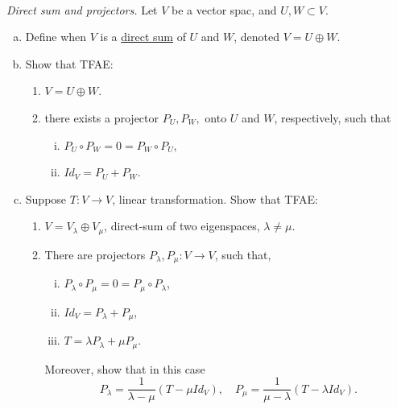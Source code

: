 \documentclass{article}
\begin{document}
\begin{problem} \\ 
\textit{Direct sum and projectors.} Let $V$ be a vector spac, and $U,W \subset V$.
\begin{enumerate}[(a)]
    \item Define when $V$ is a \underline{direct sum} of $U$ and $W$, denoted $V = U \oplus W$.
    \item Show that TFAE:
    \begin{enumerate}[1.]
        \item $V = U \oplus W$.
        \item there exists a projector $P_U, P_W,$ onto $U$ and $W$, respectively, such that
        \begin{enumerate}[i.)]
            \item $P_U \circ P_W = 0 = P_W \circ P_U$,
            \item $Id_V = P_U + P_W$.
        \end{enumerate}
    \end{enumerate}
    \item Suppose $T : V \to V$, linear transformation. Show that TFAE:
    \begin{enumerate}[1.]
        \item $V = V_\lambda \oplus V_\mu$, direct-sum of two eigenspaces, $\lambda \neq \mu$.
        \item There are projectors $P_\lambda, P_\mu: V \to V$, such that,
        \begin{enumerate}[i.)]
            \item $P_\lambda \circ P_\mu = 0 = P_\mu \circ P_\lambda$,
            \item $Id_V = P_\lambda + P_\mu$,
            \item $T = \lambda P_\lambda + \mu P_\mu$.
        \end{enumerate}
        Moreover, show that in this case
        \[
            P_\lambda = \frac{1}{\lambda - \mu}(T - \mu Id_V), \quad P_\mu = \frac{1}{\mu - \lambda}(T - \lambda Id_V).
        \]
    \end{enumerate}    
\end{enumerate}    
\end{problem}
\end{document}
